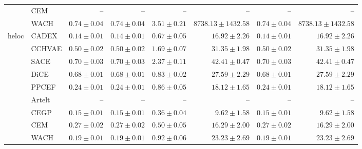 \begin{table}[ht]
\begin{center}
\begin{sc}
\begin{scriptsize}
\begin{tabular}{l|l|rrrrrr}
 & CEM & -- & -- & -- & -- & -- & -- \\
 & WACH & $0.74\pm{0.04}$ & $0.74\pm{0.04}$ & $3.51\pm{0.21}$ & $8738.13\pm{1432.58}$ & $0.74\pm{0.04}$ & $8738.13\pm{1432.58}$ \\
\midrule
\multirow{9}{*}{heloc} & CADEX & $\boldsymbol{0.14\pm{0.01}}$ & $\boldsymbol{0.14\pm{0.01}}$ & $0.67\pm{0.05}$ & $16.92\pm{2.26}$ & $\boldsymbol{0.14\pm{0.01}}$ & $16.92\pm{2.26}$ \\
 & CCHVAE & $0.50\pm{0.02}$ & $0.50\pm{0.02}$ & $1.69\pm{0.07}$ & $31.35\pm{1.98}$ & $0.50\pm{0.02}$ & $31.35\pm{1.98}$ \\
 & SACE & $0.70\pm{0.03}$ & $0.70\pm{0.03}$ & $2.37\pm{0.11}$ & $42.41\pm{0.47}$ & $0.70\pm{0.03}$ & $42.41\pm{0.47}$ \\
 & DiCE & $0.68\pm{0.01}$ & $0.68\pm{0.01}$ & $0.83\pm{0.02}$ & $27.59\pm{2.29}$ & $0.68\pm{0.01}$ & $27.59\pm{2.29}$ \\
 & PPCEF & $0.24\pm{0.01}$ & $0.24\pm{0.01}$ & $0.86\pm{0.05}$ & $18.12\pm{1.65}$ & $0.24\pm{0.01}$ & $18.12\pm{1.65}$ \\
 & Artelt & -- & -- & -- & -- & -- & -- \\
 & CEGP & $0.15\pm{0.01}$ & $0.15\pm{0.01}$ & $\boldsymbol{0.36\pm{0.04}}$ & $\boldsymbol{9.62\pm{1.58}}$ & $0.15\pm{0.01}$ & $\boldsymbol{9.62\pm{1.58}}$ \\
 & CEM & $0.27\pm{0.02}$ & $0.27\pm{0.02}$ & $0.50\pm{0.05}$ & $16.29\pm{2.00}$ & $0.27\pm{0.02}$ & $16.29\pm{2.00}$ \\
 & WACH & $0.19\pm{0.01}$ & $0.19\pm{0.01}$ & $0.92\pm{0.06}$ & $23.23\pm{2.69}$ & $0.19\pm{0.01}$ & $23.23\pm{2.69}$ \\
\bottomrule
\end{tabular}
\end{scriptsize}
\end{sc}
\end{center}
\end{table}

